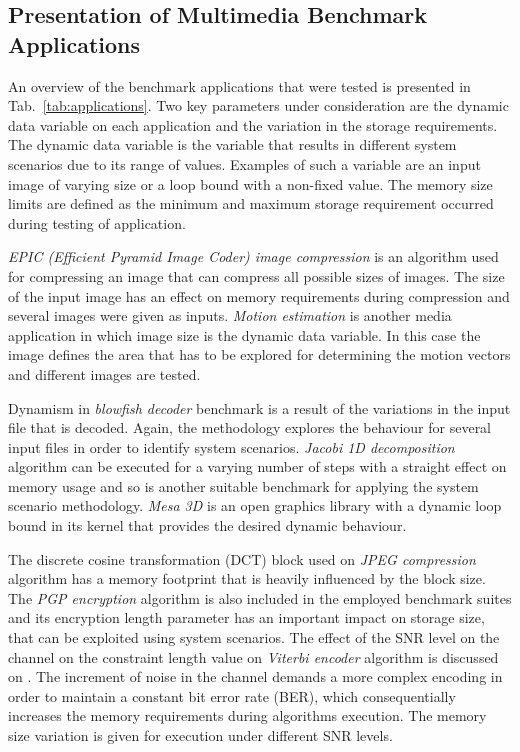 \documentclass[a4paper,conference]{IEEEtran}
\begin{document}
\subsection{Presentation of Multimedia Benchmark Applications}

An overview of the benchmark applications that were tested is presented in Tab.~\ref{tab:applications}. Two key parameters under consideration are the dynamic data variable on each application and the variation in the storage requirements. The dynamic data variable is the variable that results in different system scenarios due to its range of values. Examples of such a variable are an input image of varying size or a loop bound with a non-fixed value. The memory size limits are defined as the minimum and maximum storage requirement occurred during testing of application.

\textit{EPIC (Efficient Pyramid Image Coder) image compression} is an algorithm used for compressing an image that can compress all possible sizes of images. The size of the input image has an effect on memory requirements during compression and several images were given as inputs. \textit{Motion estimation} is another media application in which image size is the dynamic data variable. In this case the image defines the area that has to be explored for determining the motion vectors and different images are tested.

Dynamism in \textit{blowfish decoder} benchmark is a result of the variations in the input file that is decoded. Again, the methodology explores the behaviour for several input files in order to identify system scenarios. \textit{Jacobi 1D decomposition} algorithm can be executed for a varying number of steps with a straight effect on memory usage and so is another suitable benchmark for applying the system scenario methodology. \textit{Mesa 3D} is an open graphics library with a dynamic loop bound in its kernel that provides the desired dynamic behaviour. 

The discrete cosine transformation (DCT) block used on \textit{JPEG compression} algorithm has a memory footprint that is heavily influenced by the block size. The \textit{PGP encryption} algorithm is also included in the employed benchmark suites and its encryption length parameter has an important impact on storage size, that can be exploited using system scenarios. The effect of the SNR level on the channel on the constraint length value on \textit{Viterbi encoder} algorithm is discussed on \cite{Fil12}. The increment of noise in the channel demands a more complex encoding in order to maintain a constant bit error rate (BER), which consequentially increases the memory requirements during algorithms execution. The memory size variation is given for execution under different SNR levels.  
\end{document}
